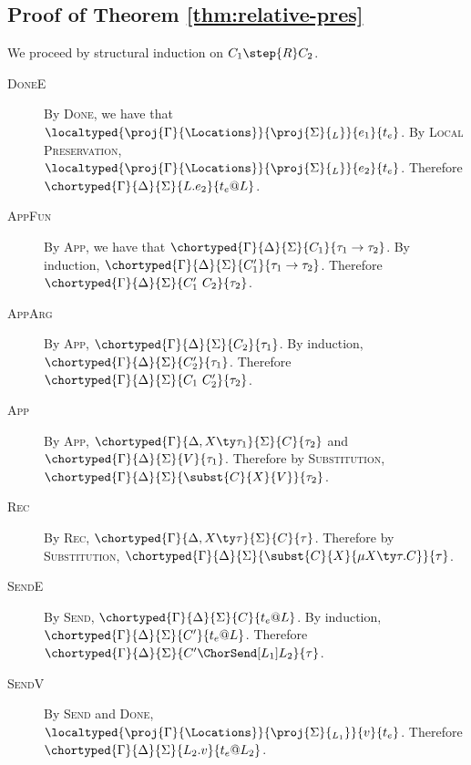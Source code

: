 \subsection{Proof of Theorem \ref{thm:relative-pres}}
We proceed by structural induction on $C_1 \step{R} C_2$.
\begin{description}
  \item[\textsc{DoneE}]
  By \textsc{Done}, we have that $\localtyped{\proj{\Gamma}{\Locations}}{\proj{\Sigma}{_L}}{e_1}{t_e}$.
  By \textsc{Local Preservation}, $\localtyped{\proj{\Gamma}{\Locations}}{\proj{\Sigma}{_L}}{e_2}{t_e}$.
  Therefore $\chortyped{\Gamma}{\Delta}{\Sigma}{L.e_2}{t_e @ L}$.

  \item[\textsc{AppFun}]
  By \textsc{App}, we have that $\chortyped{\Gamma}{\Delta}{\Sigma}{C_1}{\tau_1 \to \tau_2}$.
  By induction, $\chortyped{\Gamma}{\Delta}{\Sigma}{C_1'}{\tau_1 \to \tau_2}$.
  Therefore $\chortyped{\Gamma}{\Delta}{\Sigma}{C_1'~C_2}{\tau_2}$.

  \item[\textsc{AppArg}]
  By \textsc{App}, $\chortyped{\Gamma}{\Delta}{\Sigma}{C_2}{\tau_1}$.
  By induction, $\chortyped{\Gamma}{\Delta}{\Sigma}{C_2'}{\tau_1}$.
  Therefore $\chortyped{\Gamma}{\Delta}{\Sigma}{C_1~C_2'}{\tau_2}$.

  \item[\textsc{App}]
  By \textsc{App}, $\chortyped{\Gamma}{\Delta, X \ty \tau_1}{\Sigma}{C}{\tau_2}$ and $\chortyped{\Gamma}{\Delta}{\Sigma}{V}{\tau_1}$.
  Therefore by \textsc{Substitution}, $\chortyped{\Gamma}{\Delta}{\Sigma}{\subst{C}{X}{V}}{\tau_2}$.

  \item[\textsc{Rec}]
  By \textsc{Rec}, $\chortyped{\Gamma}{\Delta, X \ty \tau}{\Sigma}{C}{\tau}$.
  Therefore by \textsc{Substitution}, $\chortyped{\Gamma}{\Delta}{\Sigma}{\subst{C}{X}{\mu X \ty \tau.C}}{\tau}$.

  \item[\textsc{SendE}]
  By \textsc{Send}, $\chortyped{\Gamma}{\Delta}{\Sigma}{C}{t_e @ L}$.
  By induction, $\chortyped{\Gamma}{\Delta}{\Sigma}{C'}{t_e @ L}$.
  Therefore $\chortyped{\Gamma}{\Delta}{\Sigma}{C' \ChorSend[L_1] L_2}{\tau}$.

  \item[\textsc{SendV}]
  By \textsc{Send} and \textsc{Done}, $\localtyped{\proj{\Gamma}{\Locations}}{\proj{\Sigma}{_{L_1}}}{v}{t_e}$.
  Therefore $\chortyped{\Gamma}{\Delta}{\Sigma}{L_2.v}{t_e @ L_2}$.


\end{description}
